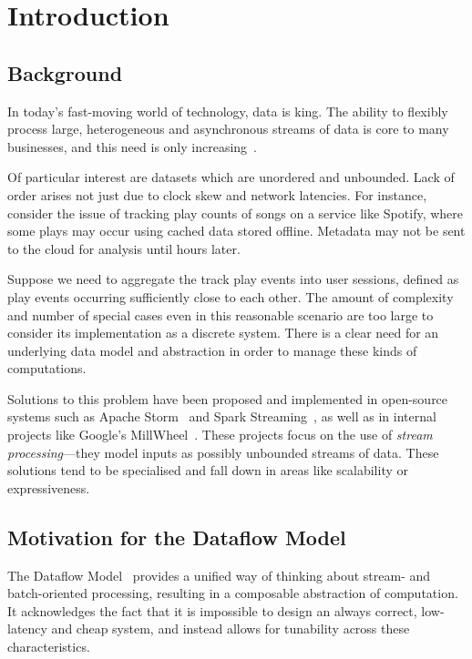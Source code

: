 \chapter{Introduction}\label{ch:intro}

\section{Background}\label{sec:intro:background}

In today's fast-moving world of technology, data is king.
The ability to flexibly process large, heterogeneous and asynchronous streams of data is core to many businesses, and this need is only increasing~\cite{Yin_2015}\cite{mit_bean_variety}.

Of particular interest are datasets which are unordered and unbounded.
Lack of order arises not just due to clock skew and network latencies.
For instance, consider the issue of tracking play counts of songs on a service like Spotify, where some plays may occur using cached data stored offline.
Metadata may not be sent to the cloud for analysis until hours later.

Suppose we need to aggregate the track play events into user sessions, defined as play events occurring sufficiently close to each other.
The amount of complexity and number of special cases even in this reasonable scenario are too large to consider its implementation as a discrete system.
There is a clear need for an underlying data model and abstraction in order to manage these kinds of computations.

Solutions to this problem have been proposed and implemented in open-source systems such as Apache Storm~\cite{apache_storm} and Spark Streaming~\cite{spark:zaharia2013discretized}, as well as in internal projects like Google's MillWheel~\cite{akidau2013millwheel}.
These projects focus on the use of \emph{stream processing}---they model inputs as possibly unbounded streams of data.
These solutions tend to be specialised and fall down in areas like scalability or expressiveness.

\section{Motivation for the Dataflow Model}\label{sec:intro:motivation}

The Dataflow Model~\cite{Akidau:2015} provides a unified way of thinking about stream- and batch-oriented processing, resulting in a composable abstraction of computation.
It acknowledges the fact that it is impossible to design an always correct, low-latency and cheap system, and instead allows for tunability across these characteristics.


